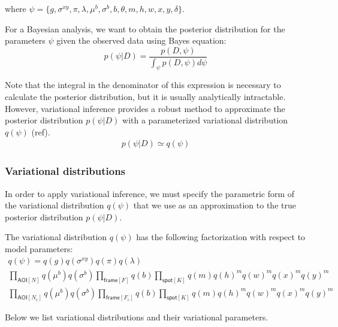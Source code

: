 \noindent
where $\psi = \{ g, \sigma^{xy}, \pi, \lambda, \mu^b, \sigma^b, b, \theta, m, h, w, x, y, \delta \}$.

For a Bayesian analysis, we want to obtain the posterior distribution for the parameters $\psi$ given the observed data using Bayes equation:
%
\begin{equation}
    p(\psi | D) =
    \dfrac{p(D, \psi)}{\int_\psi p(D, \psi) d\psi}
\end{equation}

Note that the integral in the denominator of this expression is necessary to calculate the posterior distribution, but it is usually analytically intractable. However, variational inference provides a robust method to approximate the posterior distribution $p(\psi | D)$ with a parameterized variational distribution $q(\psi)$ (ref).
%
\begin{gather*}
    p(\psi | D) \simeq q(\psi)
\end{gather*}


\subsubsection*{Variational distributions}

In order to apply variational inference, we must specify the parametric form of the variational distribution $q(\psi)$
that we use as an approximation to the true posterior distribution $p(\psi | D)$.

The variational distribution $q(\psi)$ has the following factorization with respect to model parameters:
%
\begin{gather*}
    q(\psi) = q(g) q(\sigma^{xy}) q(\pi) q(\lambda) \\
    \prod_{\mathsf{AOI}[N]} q(\mu^b) q(\sigma^b) \prod_{\mathsf{frame}[F]} q(b) \prod_{\mathsf{spot}[K]} q(m) q(h)^m q(w)^m q(x)^m q(y)^m \\
    \prod_{\mathsf{AOI}[N_c]} q(\mu^b) q(\sigma^b) \prod_{\mathsf{frame}[F_c]} q(b) \prod_{\mathsf{spot}[K]} q(m) q(h)^m q(w)^m q(x)^m q(y)^m
\end{gather*}

Below we list variational distributions and their variational parameters.

